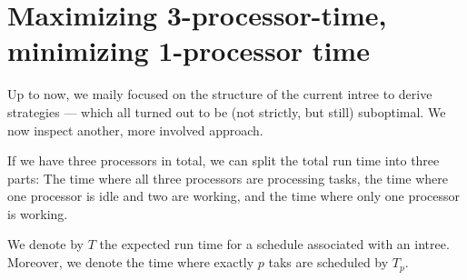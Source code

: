 \begin{center}
\end{center}

\section{Maximizing 3-processor-time, minimizing 1-processor time}
\label{sec:p3-disproving-long-p3-and-short-p1-time}

Up to now, we maily focused on the structure of the current intree to derive strategies --- which all turned out to be (not strictly, but still) suboptimal. We now inspect another, more involved approach.

If we have three processors in total, we can split the total run time into three parts: The time where all three processors are processing tasks, the time where one processor is idle and two are working, and the time where only one processor is working.


\begin{definition}
  We denote by $T$ the expected run time for a schedule associated with an intree. 
  Moreover, we denote the time where exactly $p$ taks are scheduled by $T_p$.
\end{definition}


